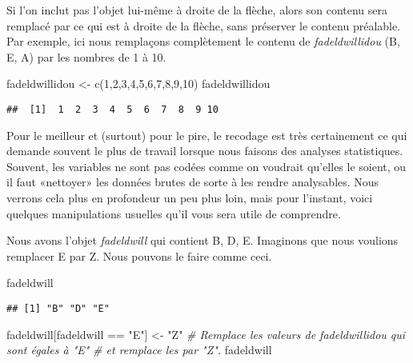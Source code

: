 \documentclass[
]{book}
\newenvironment{Shaded}{\begin{snugshade}}{\end{snugshade}}
\newcommand{\CommentTok}[1]{\textcolor[rgb]{0.56,0.35,0.01}{\textit{#1}}}
\newcommand{\DecValTok}[1]{\textcolor[rgb]{0.00,0.00,0.81}{#1}}
\newcommand{\FunctionTok}[1]{\textcolor[rgb]{0.00,0.00,0.00}{#1}}
\newcommand{\NormalTok}[1]{#1}
\newcommand{\OtherTok}[1]{\textcolor[rgb]{0.56,0.35,0.01}{#1}}
\newcommand{\SpecialCharTok}[1]{\textcolor[rgb]{0.00,0.00,0.00}{#1}}
\newcommand{\StringTok}[1]{\textcolor[rgb]{0.31,0.60,0.02}{#1}}
\begin{document}
Si l'on inclut pas l'objet lui-même à droite de la flèche, alors son contenu sera remplacé par ce qui est à droite de la flèche, sans préserver le contenu préalable. Par exemple, ici nous remplaçons complètement le contenu de \emph{fadeldwillidou} (B, E, A) par les nombres de 1 à 10.

\begin{Shaded}
\begin{Highlighting}[]
\NormalTok{fadeldwillidou }\OtherTok{\textless{}{-}} \FunctionTok{c}\NormalTok{(}\DecValTok{1}\NormalTok{,}\DecValTok{2}\NormalTok{,}\DecValTok{3}\NormalTok{,}\DecValTok{4}\NormalTok{,}\DecValTok{5}\NormalTok{,}\DecValTok{6}\NormalTok{,}\DecValTok{7}\NormalTok{,}\DecValTok{8}\NormalTok{,}\DecValTok{9}\NormalTok{,}\DecValTok{10}\NormalTok{)}
\NormalTok{fadeldwillidou}
\end{Highlighting}
\end{Shaded}

\begin{verbatim}
##  [1]  1  2  3  4  5  6  7  8  9 10
\end{verbatim}

Pour le meilleur et (surtout) pour le pire, le recodage est très certainement ce qui demande souvent le plus de travail lorsque nous faisons des analyses statistiques. Souvent, les variables ne sont pas codées comme on voudrait qu'elles le soient, ou il faut «nettoyer» les données brutes de sorte à les rendre analysables. Nous verrons cela plus en profondeur un peu plus loin, mais pour l'instant, voici quelques manipulations usuelles qu'il vous sera utile de comprendre.

Nous avons l'objet \emph{fadeldwill} qui contient B, D, E. Imaginons que nous voulions remplacer E par Z. Nous pouvons le faire comme ceci.

\begin{Shaded}
\begin{Highlighting}[]
\NormalTok{fadeldwill}
\end{Highlighting}
\end{Shaded}

\begin{verbatim}
## [1] "B" "D" "E"
\end{verbatim}

\begin{Shaded}
\begin{Highlighting}[]
\NormalTok{fadeldwill[fadeldwill }\SpecialCharTok{==} \StringTok{"E"}\NormalTok{] }\OtherTok{\textless{}{-}} \StringTok{"Z"}
\CommentTok{\# Remplace les valeurs de fadeldwillidou qui sont égales à "E" }
\CommentTok{\# et remplace les par "Z".}
\NormalTok{fadeldwill}
\end{Highlighting}
\end{Shaded}
\end{document}
